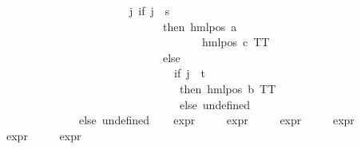 \begin{isabellebody}
\ \ \ \ \ \ \ \ \ \ \ \ \ \ \ \ \ \ \ \ \ \ \ \ {\isacharparenleft}{\kern0pt}{\isasymlambda}j{\isachardot}{\kern0pt}\ {\isacharparenleft}{\kern0pt}if\ j\ {\isacharequal}{\kern0pt}\ s\ \isanewline
\ \ \ \ \ \ \ \ \ \ \ \ \ \ \ \ \ \ \ \ \ \ \ \ \ \ \ \ \ \ then\ {\isacharparenleft}{\kern0pt}hml{\isacharunderscore}{\kern0pt}pos\ a\ \isanewline
\ \ \ \ \ \ \ \ \ \ \ \ \ \ \ \ \ \ \ \ \ \ \ \ \ \ \ \ \ \ \ \ \ \ \ \ \ {\isacharparenleft}{\kern0pt}hml{\isacharunderscore}{\kern0pt}pos\ c\ TT{\isacharparenright}{\kern0pt}{\isacharparenright}{\kern0pt}\ \isanewline
\ \ \ \ \ \ \ \ \ \ \ \ \ \ \ \ \ \ \ \ \ \ \ \ \ \ \ \ \ \ else\ \isanewline
\ \ \ \ \ \ \ \ \ \ \ \ \ \ \ \ \ \ \ \ \ \ \ \ \ \ \ \ \ \ \ \ {\isacharparenleft}{\kern0pt}if\ j\ {\isacharequal}{\kern0pt}\ t\ \isanewline
\ \ \ \ \ \ \ \ \ \ \ \ \ \ \ \ \ \ \ \ \ \ \ \ \ \ \ \ \ \ \ \ \ then\ {\isacharparenleft}{\kern0pt}hml{\isacharunderscore}{\kern0pt}pos\ b\ TT{\isacharparenright}{\kern0pt}\ \isanewline
\ \ \ \ \ \ \ \ \ \ \ \ \ \ \ \ \ \ \ \ \ \ \ \ \ \ \ \ \ \ \ \ \ else\ undefined{\isacharparenright}{\kern0pt}{\isacharparenright}{\kern0pt}{\isacharparenright}{\kern0pt}{\isacharparenright}{\kern0pt}{\isacharparenright}{\kern0pt}\isanewline
\ \ \ \ \ \ \ \ \ \ \ \ \ \ \ else\ undefined{\isacharparenright}{\kern0pt}{\isacharparenright}{\kern0pt}{\isacharparenright}{\kern0pt}{\isacharparenright}{\kern0pt}{\isacharparenright}{\kern0pt}{\isachardoublequoteclose}\isanewline
\isanewline
{}\ \isanewline
\ \ {\isachardoublequoteopen}expr{\isacharunderscore}{\kern0pt}{}\ {\isasymphi}\ {\isacharequal}{\kern0pt}\ {}{\isachardoublequoteclose}\isanewline
\ \ {\isachardoublequoteopen}expr{\isacharunderscore}{\kern0pt}{}\ {\isasymphi}\ {\isacharequal}{\kern0pt}\ {}{\isachardoublequoteclose}\isanewline
\ \ {\isachardoublequoteopen}expr{\isacharunderscore}{\kern0pt}{}\ {\isasymphi}\ {\isacharequal}{\kern0pt}\ {}{\isachardoublequoteclose}\isanewline
\ \ {\isachardoublequoteopen}expr{\isacharunderscore}{\kern0pt}{}\ {\isasymphi}\ {\isacharequal}{\kern0pt}\ {}{\isachardoublequoteclose}\isanewline
\ \ {\isachardoublequoteopen}expr{\isacharunderscore}{\kern0pt}{}\ {\isasymphi}\ {\isacharequal}{\kern0pt}\ {}{\isachardoublequoteclose}\isanewline
\ \ {\isachardoublequoteopen}expr{\isacharunderscore}{\kern0pt}{}\ {\isasymphi}\ {\isacharequal}{\kern0pt}\ {}{\isachardoublequoteclose}\isanewline
%
\isadelimproof
\ \ %
\endisadelimproof
%
\isatagproof
{}\isamarkupfalse%

\end{isabellebody}
